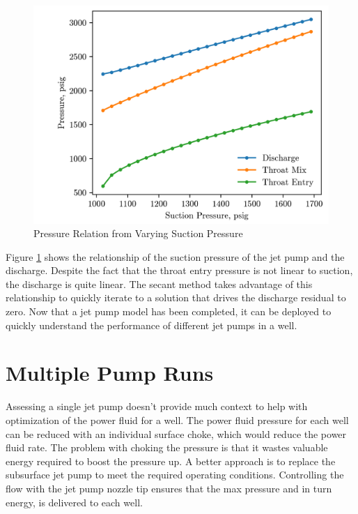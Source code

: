 \documentclass[12 pt]{report}
\begin{document}
\begin{figure}
    \centering
    \includegraphics[scale=1]{figures/prs_relation.png}
    \caption{Pressure Relation from Varying Suction Pressure}
    \label{fig:prs_relation}
\end{figure}

Figure \ref{fig:prs_relation} shows the relationship of the suction pressure of the jet pump and the discharge. Despite the fact that the throat entry pressure is not linear to suction, the discharge is quite linear. The secant method takes advantage of this relationship to quickly iterate to a solution that drives the discharge residual to zero. Now that a jet pump model has been completed, it can be deployed to quickly understand the performance of different jet pumps in a well.

\section{Multiple Pump Runs}

Assessing a single jet pump doesn't provide much context to help with optimization of the power fluid for a well. The power fluid pressure for each well can be reduced with an individual surface choke, which would reduce the power fluid rate. The problem with choking the pressure is that it wastes valuable energy required to boost the pressure up. A better approach is to replace the subsurface jet pump to meet the required operating conditions. Controlling the flow with the jet pump nozzle tip ensures that the max pressure and in turn energy, is delivered to each well.
\end{document}
